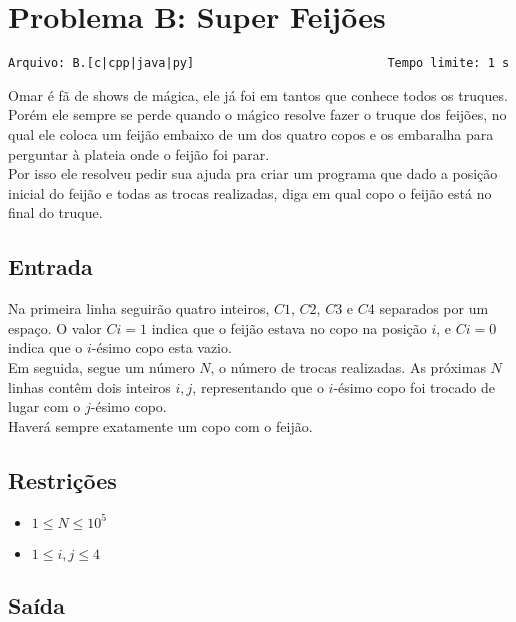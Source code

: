 \section{Problema B: Super Feijões}
\vspace{-0.52cm}
\noindent \begin{verbatim}Arquivo: B.[c|cpp|java|py]                           Tempo limite: 1 s
\end{verbatim}

Omar é fã de shows de mágica, ele já foi em tantos que conhece todos os truques. Porém ele sempre se perde quando o mágico resolve fazer o truque dos feijões, no qual ele coloca um feijão embaixo de um dos quatro copos e os embaralha para perguntar à plateia onde o feijão foi parar. \\

Por isso ele resolveu pedir sua ajuda pra criar um programa que dado a posição inicial do feijão e todas as trocas realizadas, diga em qual copo o feijão está no final do truque. \\

\subsection*{Entrada}

Na primeira linha seguirão quatro inteiros, $C1$, $C2$, $C3$ e $C4$ separados por um espaço. O valor $Ci=1$ indica que o feijão estava no copo na posição $i$, e $Ci=0$ indica que o $i$-ésimo copo esta vazio. \\
Em seguida, segue um número $N$, o número de trocas realizadas. As próximas $N$ linhas contêm dois inteiros $i, j$, representando que o $i$-ésimo copo foi trocado de lugar com o $j$-ésimo copo. \\
Haverá sempre exatamente um copo com o feijão. \\

\subsection*{Restrições}
\begin{itemize}
    \item $1 \le N \le 10^5$
    \item $1 \le i, j \le 4$
\end{itemize}

\subsection*{Saída}


